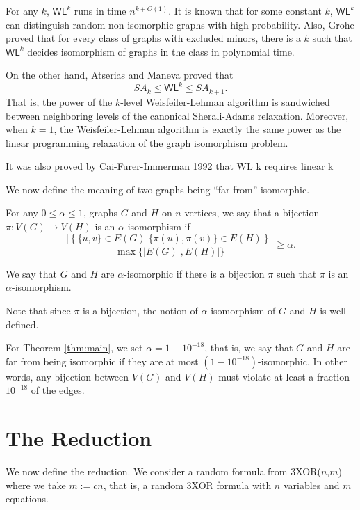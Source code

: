 \documentclass[a4paper,twoside,justified]{tufte-handout}
\begin{document}
For any $k$, $\textsf{WL}^k$ runs in time $n^{k+O(1)}$.
It is known that for some constant $k$, $\textsf{WL}^k$ can distinguish random non-isomorphic graphs
with high probability. Also, Grohe \cite{groheisomorphism} proved that 
for every class of graphs with excluded minors, there is a $k$ such that 
$\textsf{WL}^k$ decides isomorphism of graphs in the class in polynomial time.

On the other hand, Atserias and Maneva \cite{sheraliadamsisomorphism} proved that
\[
SA_k \le \textsf{WL}^k \le SA_{k+1}.
\]
That is, the power of the $k$-level Weisfeiler-Lehman algorithm is sandwiched between
neighboring levels of the canonical Sherali-Adams relaxation. Moreover, when $k=1$, 
the Weisfeiler-Lehman algorithm is exactly the same power as the linear programming relaxation of
the graph isomorphism problem.

It was also proved by Cai-Furer-Immerman 1992 that WL k requires linear k %

We now define the meaning of two graphs being ``far from'' isomorphic.
\begin{definition}\label{def:alpha-iso}
  For any $0 \le \alpha \le 1$, graphs $G$ and $H$ on $n$ vertices, we say that a bijection
  $\pi:V(G) \to V(H)$ is an $\alpha$-isomorphism if
  \[
  \frac{|\left\{ \{u,v\} \in E(G) | \{\pi(u),\pi(v)\} \in E(H) \right\}|}{\max \{|E(G)|,E(H)|\}} \ge \alpha.
  \]

  We say that $G$ and $H$ are $\alpha$-isomorphic if there is a bijection $\pi$ such that
  $\pi$ is an $\alpha$-isomorphism.
\end{definition}
\begin{remark}
  Note that since $\pi$ is a bijection, the notion of $\alpha$-isomorphism of $G$ and $H$ 
  is well defined.
\end{remark}
For Theorem \ref{thm:main}, we set $\alpha=1-10^{-18}$, that is, we say that $G$ and $H$ are far from being
isomorphic if they are at most $(1-10^{-18})$-isomorphic. In other words, any bijection between $V(G)$ and $V(H)$
must violate at least a fraction $10^{-18}$ of the edges.

\section{The Reduction}
We now define the reduction. We consider a random formula from 3XOR($n$,$m$) where we take $m:=cn$,
that is, a random 3XOR formula with $n$ variables and $m$ equations.
\end{document}
